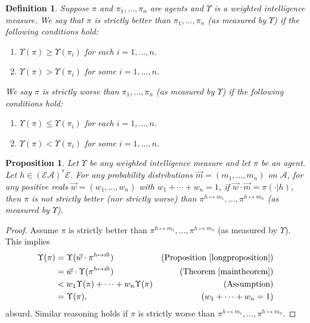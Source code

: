 \documentclass[twoside]{article}
\newtheorem{definition}[theorem]{Definition}
\newtheorem{proposition}[theorem]{Proposition}
\begin{document}
\begin{definition}
    Suppose $\pi$ and $\pi_1,\ldots,\pi_n$ are agents and $\Upsilon$ is a
    weighted intelligence measure. We say that $\pi$ is \emph{strictly better than}
    $\pi_1,\ldots,\pi_n$ (as measured by $\Upsilon$) if the following conditions hold:
    \begin{enumerate}
        \item $\Upsilon(\pi)\geq \Upsilon(\pi_i)$ for each $i=1,\ldots,n$.
        \item $\Upsilon(\pi)>\Upsilon(\pi_i)$ for some $i=1,\ldots,n$.
    \end{enumerate}
    We say $\pi$ is \emph{strictly worse than} $\pi_1,\ldots,\pi_n$ (as measured by
    $\Upsilon$) if the following conditions hold:
    \begin{enumerate}
        \item $\Upsilon(\pi)\leq \Upsilon(\pi_i)$ for each $i=1,\ldots,n$.
        \item $\Upsilon(\pi)<\Upsilon(\pi_i)$ for some $i=1,\ldots,n$.
    \end{enumerate}
\end{definition}

\begin{proposition}
\label{pointwisegenericnessthm}
    Let $\Upsilon$ be any weighted intelligence measure and let
    $\pi$ be an agent.
    Let $h\in (\mathcal E\mathcal A)^*\mathcal E$.
    For any probability distributions $\vec m=(m_1,\ldots,m_n)$ on $\mathcal A$,
    for any positive reals $\vec w=(w_1,\ldots,w_n)$ with $w_1+\cdots+w_n=1$,
    if $\vec w\cdot\vec m=\pi(\cdot|h)$,
    then $\pi$ is not strictly better (nor strictly worse) than
    $\pi^{h\mapsto m_1},\ldots,\pi^{h\mapsto m_n}$
    (as measured by $\Upsilon$).
\end{proposition}

\begin{proof}
    Assume $\pi$ is strictly better than $\pi^{h\mapsto m_1},\ldots,\pi^{h\mapsto m_n}$
    (as measured by $\Upsilon$).
    This implies
    \begin{align*}
        \Upsilon(\pi)
            &= \Upsilon(\vec w\cdot\pi^{h\mapsto\vec m})
                &\mbox{(Proposition \ref{longproposition})}\\
            &= \vec w\cdot\Upsilon(\pi^{h\mapsto\vec m})
                &\mbox{(Theorem \ref{maintheorem})}\\
            &< w_1\Upsilon(\pi)+\cdots+w_n\Upsilon(\pi)
                &\mbox{(Assumption)}\\
            &= \Upsilon(\pi),
                &\mbox{($w_1+\cdots+w_n=1$)}
    \end{align*}
    absurd. Similar reasoning holds if $\pi$ is strictly
    worse than $\pi^{h\mapsto m_1},\ldots,\pi^{h\mapsto m_n}$.
\end{proof}
\end{document}
